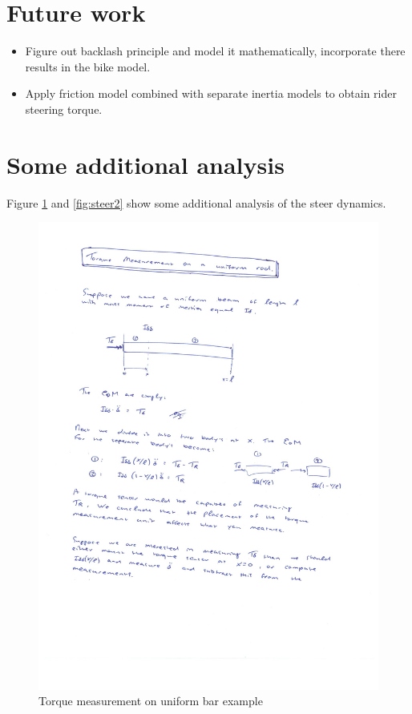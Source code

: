 \section{Future work} 
		\begin{itemize}
				\item Figure out backlash principle and model it mathematically, incorporate there results in the bike model.
				\item Apply friction model combined with separate inertia models to obtain rider steering torque. 
		\end{itemize}
\section{Some additional analysis}
Figure \ref{fig:steer1} and \ref{fig:steer2} show some additional analysis of the steer dynamics.
		\begin{figure}
			\centering
				\includegraphics[width=16cm]{images/torquemeasurement.jpg}
				\caption{Torque measurement on uniform bar example}
				\label{fig:steer1}
		\end{figure}
